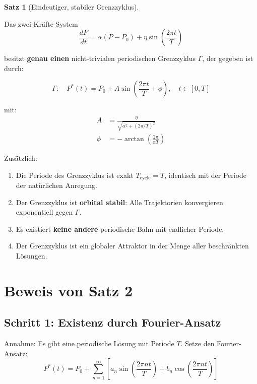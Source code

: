 \documentclass[a4paper,11pt]{report}
\theoremstyle{definition}
\newtheorem{satz}{Satz}[chapter]
\begin{document}
\begin{satz}[Eindeutiger, stabiler Grenzzyklus]\label{satz:grenzzyklus}
    
    Das zwei-Kräfte-System
    \begin{equation}
        \frac{dP}{dt} = \alpha(P - P_0) + \eta \sin\left(\frac{2\pi t}{T}\right)
    \end{equation}
    
    besitzt \textbf{genau einen} nicht-trivialen periodischen Grenzzyklus $\Gamma$, der gegeben ist durch:
    
    \begin{equation}
        \boxed{\Gamma: \quad P^*(t) = P_0 + A \sin\left(\frac{2\pi t}{T} + \phi\right), \quad t \in [0, T]}
    \end{equation}
    
    mit:
    \begin{align}
        A &= \frac{\eta}{\sqrt{\alpha^2 + (2\pi/T)^2}} \label{eq:amplitude}\\
        \phi &= -\arctan\left(\frac{2\pi}{\alpha T}\right) \label{eq:phase}
    \end{align}
    
    Zusätzlich:
    \begin{enumerate}
        \item Die Periode des Grenzzyklus ist exakt $T_{\text{cycle}} = T$, identisch mit der Periode der natürlichen Anregung.
        \item Der Grenzzyklus ist \textbf{orbital stabil}: Alle Trajektorien konvergieren exponentiell gegen $\Gamma$.
        \item Es existiert \textbf{keine andere} periodische Bahn mit endlicher Periode.
        \item Der Grenzzyklus ist ein globaler Attraktor in der Menge aller beschränkten Lösungen.
    \end{enumerate}
\end{satz}

\section{Beweis von Satz 2}

\subsection{Schritt 1: Existenz durch Fourier-Ansatz}

Annahme: Es gibt eine periodische Lösung mit Periode $T$. Setze den Fourier-Ansatz:
\begin{equation}
    P^*(t) = P_0 + \sum_{n=1}^{\infty} \left[a_n \sin\left(\frac{2\pi n t}{T}\right) + b_n \cos\left(\frac{2\pi n t}{T}\right)\right]
\end{equation}
\end{document}
